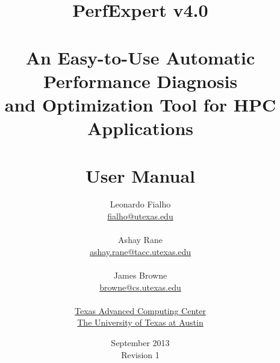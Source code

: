 \documentclass[titlepage]{report}
\begin{document}
\title{{\Huge PerfExpert v4.0}\\ \ \\
	An Easy-to-Use Automatic Performance Diagnosis\\and Optimization Tool for HPC Applications\\ \ \\
    {\Huge User Manual}
}
\author{Leonardo Fialho\\
	\href{mailto:fialho@utexas.edu}{fialho@utexas.edu}\\ \ \\
	Ashay Rane\\
	\href{mailto:ashay.rane@tacc.utexas.edu}{ashay.rane@tacc.utexas.edu}\\ \ \\
	James Browne\\
	\href{mailto:browne@cs.utexas.edu}{browne@cs.utexas.edu}\\ \ \\
	\href{http://www.tacc.utexas.edu}{Texas Advanced Computing Center}\\
	\href{http://www.utexas.edu}{The University of Texas at Austin}}
\date{September 2013\\
	Revision 1}
\maketitle

\tableofcontents






\end{document}
